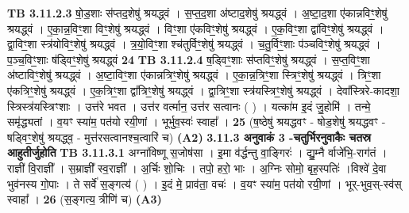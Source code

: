 \documentclass[17pt]{extarticle}
\begin{document}
{{{{{{{{{{{{{{{{{{{{{{                  \newline
                                \textbf{ TB 3.11.2.3} \newline
                  षो॒ड॒शाः स॑प्तद॒शेषु॑ श्रयद्ध्वं । स॒प्त॒द॒शा अ॑ष्टाद॒शेषु॑ श्रयद्ध्वं । अ॒ष्टा॒द॒शा ए॑कान्नविꣳ॒॒शेषु॑ श्रयद्ध्वं । ए॒का॒न्न॒विꣳ॒॒शा विꣳ॒॒शेषु॑ श्रयद्ध्वं । विꣳ॒॒शा ए॑कविꣳ॒॒शेषु॑ श्रयद्ध्वं । ए॒क॒विꣳ॒॒शा द्वा॑विꣳ॒॒शेषु॑ श्रयद्ध्वं । द्वा॒विꣳ॒॒शा स्त्र॑योविꣳ॒॒शेषु॑ श्रयद्ध्वं । त्र॒यो॒विꣳ॒॒शा श्च॑तुर्विꣳ॒॒शेषु॑ श्रयद्ध्वं । च॒तु॒र्विꣳ॒॒शाः प॑ञ्चविꣳ॒॒शेषु॑ श्रयद्ध्वं । प॒ञ्च॒विꣳ॒॒शाः ष॑ड्विꣳ॒॒शेषु॑ श्रयद्ध्वं \textbf{ 24} \newline
                  \newline
                                \textbf{ TB 3.11.2.4} \newline
                  ष॒ड्विꣳ॒॒शाः स॑प्तविꣳ॒॒शेषु॑ श्रयद्ध्वं । स॒प्त॒विꣳ॒॒शा अ॑ष्टाविꣳ॒॒शेषु॑ श्रयद्ध्वं । अ॒ष्टा॒विꣳ॒॒शा ए॑कान्नत्रिꣳ॒॒शेषु॑ श्रयद्ध्वं । ए॒का॒न्न॒त्रिꣳ॒॒शा स्त्रिꣳ॒॒शेषु॑ श्रयद्ध्वं । त्रिꣳ॒॒शा ए॑कत्रिꣳ॒॒शेषु॑ श्रयद्ध्वं । ए॒क॒त्रिꣳ॒॒शा द्वा᳚त्रिꣳ॒॒शेषु॑ श्रयद्ध्वं । द्वा॒त्रिꣳ॒॒शा स्त्र॑यस्त्रिꣳ॒॒शेषु॑ श्रयद्ध्वं । देवा᳚स्त्रिरे-कादशा॒ स्त्रिस्त्र॑यस्त्रिꣳशाः । उत्त॑रे भवत । उत्त॑र वर्त्मान॒ उत्त॑र सत्वानः ( ) । यत्का॑म इ॒दं जु॒होमि॑ । तन्मे॒ समृ॑द्ध्यतां । व॒यꣳ स्या॑म॒ पत॑यो रयी॒णां । भूर्भुव॒स्वः॑ स्वाहा᳚ । \textbf{ 25} \newline
                  \newline
                                    (ष॒ष्ठेषु॑ श्रयद्धवꣳ - षोड॒शेषु॑ श्रयद्धवꣳ - षड्विꣳ॒॒शेषु॑ श्रयद्ध्व॒ - मुत्त॑रसत्वानश्च॒त्वारि॑ च) \textbf{(A2)} \newline \newline
                \textbf{ 3.11.3    अनुवाकं   3 -चतुर्भिरनुवाकैः चतस्र आहुतीर्जुहोति} \newline
                                \textbf{ TB 3.11.3.1} \newline
                  अग्ना॑विष्णू स॒जोष॑सा । इ॒मा व॑र्द्धन्तु वा॒ङ्गिरः॑ । द्यु॒म्नै र्वाजे॑भि॒-राग॑तं । राज्ञी॑ वि॒राज्ञी᳚ । स॒म्राज्ञी᳚ स्व॒राज्ञी᳚ । अ॒र्चिः शो॒चिः । तपो॒ हरो॒ भाः । अ॒ग्निः सोमो॒ बृह॒स्पतिः॑ ।विश्वे॑ दे॒वा भुव॑नस्य गो॒पाः । ते सर्वे॑ स॒ङ्गत्य॑ ( ) । इ॒दं मे॒ प्राव॑ता॒ वचः॑ । व॒यꣳ स्या॑म॒ पत॑यो रयी॒णां । भूर्-भुव॒स्-स्व॑स् स्वाहा᳚ । \textbf{ 26} \newline
                  \newline
                                    (स॒ङ्गत्य॒ त्रीणि॑ च) \textbf{(A3)} \newline \newline
}}}}}}}}}}}}}}}}}}}}}}
\end{document}
